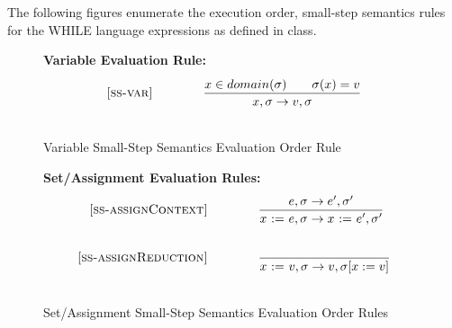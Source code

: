 \documentclass{article}
\newcommand{\assign}[2]{#1~{:=}~#2}
\newcommand{\ife}[3]{\mbox{\tt if}~{#1}~\mbox{\tt then}~{#2}~\mbox{\tt else}~{#3}}
\newcommand{\whilee}[2]{\mbox{\tt while}~(#1)~#2}
\newcommand{\true}{\mbox{\tt true}}
\newcommand{\false}{\mbox{\tt false}}
\begin{document}
The following figures enumerate the execution order, small-step semantics rules for the WHILE language expressions as defined in class.  

\iffalse
\begin{figure}[H]\label{fig:smallstep}
\caption{Small-step semantics for WHILE}
{\bf Runtime Syntax:}
\[
\begin{array}{rclcl}
  \sigma & \in & {Store} \quad  & = & \quad {variable} ~\rightarrow ~v \\
  \\
\end{array}
\]
{\bf Evaluation Rules:~~~ \fbox{$\sstepraw{e}{\sigma}{e'}{\sigma'}$}} \\
\[
\begin{array}{r@{\qquad\qquad}l}
\ssrule{ss-var}{
  x \in domain(\sigma) \qquad \sigma(x)=v
}{
  \sstep{x}{\sigma}{v}{\sigma}
}
\ssrule{ss-assign}{
}{
  \sstep{\assign{x}{v}}{\sigma}{v}{\sigma[x:=v]}
}
\ssrule{ss-op}{
  v = v_1 ~op~ v_2
}{
  \sstep{v_1~op~v_2}{\sigma}{v}{\sigma}
}
\ssrule{ss-seq}{
}{
  \sstep{v;e}{\sigma}{e}{\sigma}
}
\ssrule{ss-iftrue}{
}{
  \sstep{\ife{\true}{e_1}{e_2}}{\sigma}{e_1}{\sigma}
}
\ssrule{ss-iffalse}{
}{
  \sstep{\ife{\false}{e_1}{e_2}}{\sigma}{e_2}{\sigma}
}
\ssrule{ss-while}{
}{
  \sstep{\whilee{e_1}{e_2}}{\sigma}{\ife{e_1}{e_2;\whilee{e_1}{e_2}}{\false}}{\sigma}
}
\end{array}
\]
\end{figure}
\fi

\begin{figure}[H]\label{fig:varRules}
\caption{Variable Small-Step Semantics Evaluation Order Rule}
{\bf Variable Evaluation Rule:}
\[
\\
\begin{array}{r@{\qquad\qquad}l}
\ssrule{ss-var}{
  x \in domain(\sigma) \qquad \sigma(x)=v
}{
  \sstep{x}{\sigma}{v}{\sigma}
}
\end{array}
\]
\end{figure}

\begin{figure}[H]\label{fig:assignRules}
\caption{Set/Assignment Small-Step Semantics Evaluation Order Rules}
{\bf Set/Assignment Evaluation Rules:} 
\[
\\
\begin{array}{r@{\qquad\qquad}l}
\ssrule{ss-assignContext}{
  \sstep{e}{\sigma}{e'}{\sigma'}
}{
  \sstep{\assign{x}{e}}{\sigma}{\assign{x}{e'}}{\sigma'}
}
\ssrule{ss-assignReduction}{
}{
  \sstep{\assign{x}{v}}{\sigma}{v}{\sigma[x:=v]}
}
\end{array}
\]
\end{figure}
\end{document}
